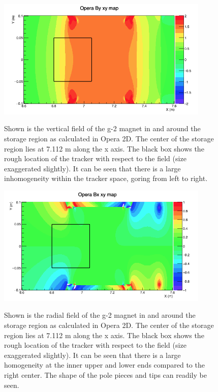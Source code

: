 \documentclass{article}
\begin{document}
\begin{figure}[]
\caption{Shown is the vertical field of the g-2 magnet in and around the storage region as calculated in Opera 2D. The center of the storage region lies at 7.112 m along the x axis. The black box shows the rough location of the tracker with respect to the field (size exaggerated slightly). It can be seen that there is a large inhomogeneity within the tracker space, goring from left to right.}
\centering
\includegraphics[width=0.9\textwidth]{operaBy}
\label{fig:operaBy}
\end{figure}

\begin{figure}[]
\caption{Shown is the radial field of the g-2 magnet in and around the storage region as calculated in Opera 2D. The center of the storage region lies at 7.112 m along the x axis. The black box shows the rough location of the tracker with respect to the field (size exaggerated slightly). It can be seen that there is a large homogeneity at the inner upper and lower ends compared to the right center. The shape of the pole pieces and tips can readily be seen.}
\centering
\includegraphics[width=0.9\textwidth]{operaBx}
\label{fig:operaBx}
\end{figure}
\end{document}
